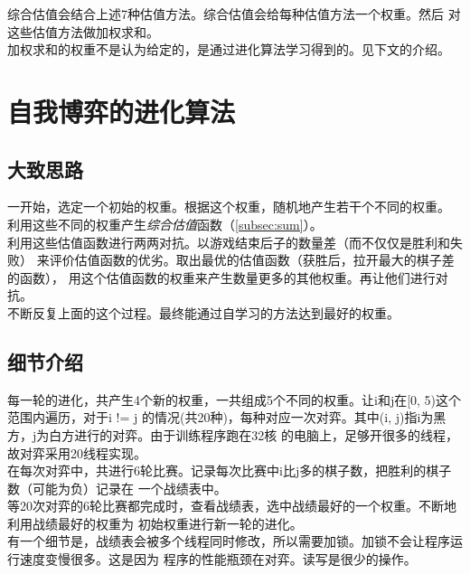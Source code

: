 \documentclass[a4paper]{article}
\begin{document}
综合估值会结合上述7种估值方法。综合估值会给每种估值方法一个权重。然后
对这些估值方法做加权求和。\\

加权求和的权重不是认为给定的，是通过进化算法学习得到的。见下文的介绍。

\section{自我博弈的进化算法}
\subsection{大致思路}
一开始，选定一个初始的权重。根据这个权重，随机地产生若干个不同的权重。
利用这些不同的权重产生\emph{综合估值}函数（\autoref{subsec:sum}）。\\

利用这些估值函数进行两两对抗。以游戏结束后子的数量差（而不仅仅是胜利和失败）
来评价估值函数的优劣。取出最优的估值函数（获胜后，拉开最大的棋子差的函数），
用这个估值函数的权重来产生数量更多的其他权重。再让他们进行对抗。\\

不断反复上面的这个过程。最终能通过自学习的方法达到最好的权重。

\subsection{细节介绍}
每一轮的进化，共产生4个新的权重，一共组成5个不同的权重。让i和j在[0, 5)这个范围内遍历，对于i != j
的情况(共20种)，每种对应一次对弈。其中(i, j)指i为黑方，j为白方进行的对弈。由于训练程序跑在32核
的电脑上，足够开很多的线程，故对弈采用20线程实现。\\

在每次对弈中，共进行6轮比赛。记录每次比赛中i比j多的棋子数，把胜利的棋子数（可能为负）记录在
一个战绩表中。\\

等20次对弈的6轮比赛都完成时，查看战绩表，选中战绩最好的一个权重。不断地利用战绩最好的权重为
初始权重进行新一轮的进化。\\

有一个细节是，战绩表会被多个线程同时修改，所以需要加锁。加锁不会让程序运行速度变慢很多。这是因为
程序的性能瓶颈在对弈。读写是很少的操作。
\end{document}
